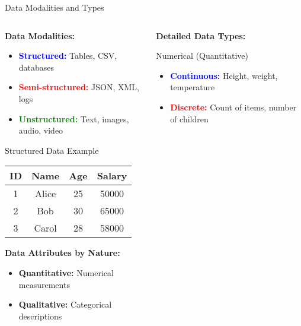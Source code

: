 \documentclass[8pt,aspectratio=1610]{beamer}
\begin{document}
\begin{frame}{Data Modalities and Types}
\begin{columns}[t]
\begin{column}{0.48\textwidth}
\textbf{Data Modalities:}
\begin{itemize}
\setlength{\itemsep}{1pt}
\item \textcolor{blue}{\textbf{Structured:}} Tables, CSV, databases
\item \textcolor{red}{\textbf{Semi-structured:}} JSON, XML, logs
\item \textcolor{green}{\textbf{Unstructured:}} Text, images, audio, video
\end{itemize}

\vspace{0.3cm}
\begin{block}{Structured Data Example}
\scriptsize
\begin{tabular}{|c|c|c|c|}
\hline
\textbf{ID} & \textbf{Name} & \textbf{Age} & \textbf{Salary} \\
\hline
1 & Alice & 25 & 50000 \\
2 & Bob & 30 & 65000 \\
3 & Carol & 28 & 58000 \\
\hline
\end{tabular}
\end{block}

\vspace{0.3cm}
\textbf{Data Attributes by Nature:}
\begin{itemize}
\setlength{\itemsep}{1pt}
\item \textbf{Quantitative:} Numerical measurements
\item \textbf{Qualitative:} Categorical descriptions
\end{itemize}
\end{column}

\begin{column}{0.48\textwidth}
\textbf{Detailed Data Types:}
\vspace{0.2cm}

\begin{block}{Numerical (Quantitative)}
\begin{itemize}
\setlength{\itemsep}{1pt}
\item \textcolor{blue}{\textbf{Continuous:}} Height, weight, temperature
\item \textcolor{red}{\textbf{Discrete:}} Count of items, number of children
\end{itemize}
\end{block}


\end{column}
\end{columns}
\end{frame}
\end{document}
